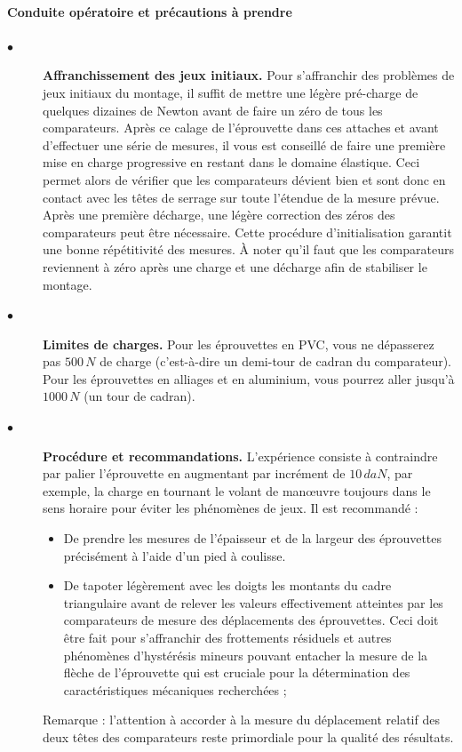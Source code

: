 \documentclass[lecture.tex]{subfiles}
\begin{document}
\paragraph*{Conduite opératoire et précautions à prendre}
\label{Sec_JeuInitiaux}

\begin{description}
  \item[$\bullet$] \textbf{Affranchissement des jeux initiaux.}
Pour s'affranchir des problèmes de jeux initiaux du montage, il suffit de mettre une légère pré-charge de quelques dizaines de Newton avant de faire un zéro de tous les comparateurs.
Après ce calage de l'éprouvette dans ces attaches et avant d'effectuer une série de mesures, il vous est conseillé de faire une première mise en charge progressive en restant dans le domaine élastique. Ceci permet alors de vérifier que les comparateurs dévient bien et sont donc en contact avec les têtes de serrage sur toute l'étendue de la mesure prévue. Après une première décharge, une légère correction des zéros des comparateurs peut être nécessaire. Cette procédure d'initialisation garantit une bonne répétitivité des mesures. À noter qu'il faut que les comparateurs reviennent à zéro après une charge et une décharge afin de stabiliser le montage.

  \item[$\bullet$] \textbf{Limites de charges.}
Pour les éprouvettes en PVC, vous ne dépasserez pas $500\, N$ de charge (c'est-à-dire un demi-tour de cadran du comparateur). Pour les éprouvettes en alliages et en aluminium, vous pourrez aller jusqu'à $1000\, N$ (un tour de cadran).

\item[$\bullet$] \textbf{Procédure et recommandations.} L'expérience consiste à contraindre par palier l'éprouvette en augmentant par incrément de $10\, daN$, par exemple, la charge en tournant le volant de manœuvre toujours dans le sens horaire pour éviter les phénomènes de jeux. Il est recommandé :

\begin{itemize}[label =, font = \tiny]
\item De prendre les mesures de l'épaisseur et de la largeur des éprouvettes précisément à l'aide d'un pied à coulisse.
\item De tapoter légèrement avec les doigts les montants du cadre triangulaire avant de relever les valeurs effectivement atteintes par les comparateurs de mesure des déplacements des éprouvettes. Ceci doit être fait pour s'affranchir des frottements résiduels et autres phénomènes d'hystérésis mineurs pouvant entacher la mesure de la flèche de l'éprouvette qui est cruciale pour la détermination des caractéristiques mécaniques recherchées ;
\end{itemize}
\vspace{\baselineskip}
Remarque : l'attention à accorder à la mesure du déplacement relatif des deux têtes des comparateurs reste primordiale pour la qualité des résultats.


\end{description}
\end{document}
